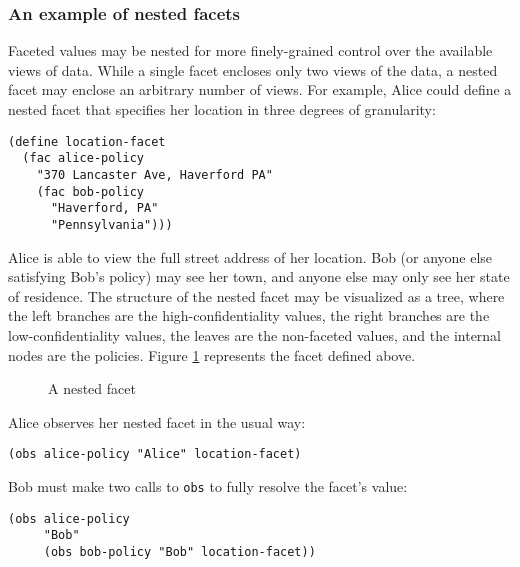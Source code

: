 \documentclass{article}
\begin{document}
\subsubsection{An example of nested facets}
Faceted values may be nested for more finely-grained control over the available views of data. While a single facet encloses only two views of the data, a nested facet may enclose an arbitrary number of views. For example, Alice could define a nested facet that specifies her location in three degrees of granularity:

\begin{lstlisting}
(define location-facet
  (fac alice-policy
    "370 Lancaster Ave, Haverford PA"
    (fac bob-policy
      "Haverford, PA"
      "Pennsylvania")))
\end{lstlisting}

Alice is able to view the full street address of her location. Bob (or anyone else satisfying Bob's policy) may see her town, and anyone else may only see her state of residence. The structure of the nested facet may be visualized as a tree, where the left branches are the high-confidentiality values, the right branches are the low-confidentiality values, the leaves are the non-faceted values, and the internal nodes are the policies. Figure \ref{figure:nested} represents the facet defined above.

\begin{figure}[h]
\begin{center}
	\caption{A nested facet}
	\label{figure:nested}
\end{center}
\end{figure}

Alice observes her nested facet in the usual way:

\begin{lstlisting}
(obs alice-policy "Alice" location-facet)
\end{lstlisting}

Bob must make two calls to \texttt{obs} to fully resolve the facet's value:

\begin{lstlisting}
(obs alice-policy
     "Bob"
     (obs bob-policy "Bob" location-facet))
\end{lstlisting}
\end{document}
